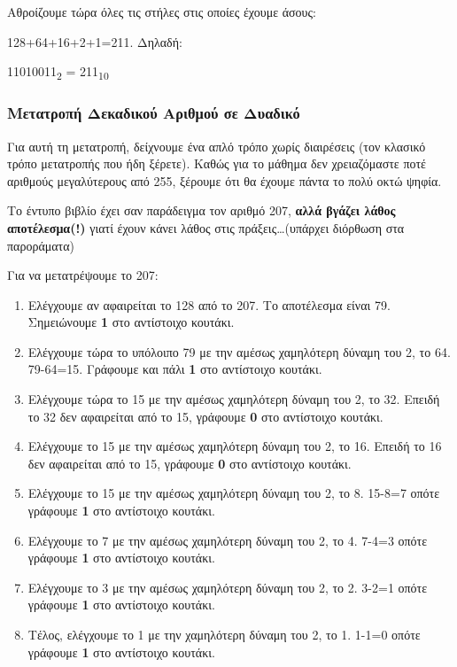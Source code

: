 Αθροίζουμε τώρα όλες τις στήλες στις οποίες έχουμε άσους:

128+64+16+2+1=211. Δηλαδή:

11010011\textsubscript{2} = 211\textsubscript{10}

\subsubsection*{Μετατροπή Δεκαδικού Αριθμού σε Δυαδικό}

Για αυτή τη μετατροπή, δείχνουμε ένα απλό τρόπο χωρίς διαιρέσεις (τον κλασικό τρόπο μετατροπής που ήδη ξέρετε). Καθώς για το μάθημα δεν χρειαζόμαστε ποτέ αριθμούς μεγαλύτερους από 255, ξέρουμε ότι θα έχουμε πάντα το πολύ οκτώ ψηφία.

Το έντυπο βιβλίο έχει σαν παράδειγμα τον αριθμό 207, \textbf{αλλά βγάζει λάθος αποτέλεσμα(!)} γιατί έχουν κάνει λάθος στις πράξεις\ldots (υπάρχει διόρθωση στα παροράματα)

Για να μετατρέψουμε το 207:

\begin{enumerate}
\item Ελέγχουμε αν αφαιρείται το 128 από το 207. Το αποτέλεσμα είναι 79. Σημειώνουμε \textbf{1} στο αντίστοιχο κουτάκι.
\item Ελέγχουμε τώρα το υπόλοιπο 79 με την αμέσως χαμηλότερη δύναμη του 2, το 64. 79-64=15. Γράφουμε και πάλι \textbf{1} στο αντίστοιχο κουτάκι.
\item Ελέγχουμε τώρα το 15 με την αμέσως χαμηλότερη δύναμη του 2, το 32. Επειδή το 32 δεν αφαιρείται από το 15, γράφουμε \textbf{0} στο αντίστοιχο κουτάκι.
\item Ελέγχουμε το 15 με την αμέσως χαμηλότερη δύναμη του 2, το 16. Επειδή το 16 δεν αφαιρείται από το 15, γράφουμε \textbf{0} στο αντίστοιχο κουτάκι.
\item Ελέγχουμε το 15 με την αμέσως χαμηλότερη δύναμη του 2, το 8. 15-8=7 οπότε γράφουμε \textbf{1} στο αντίστοιχο κουτάκι.
\item Ελέγχουμε το 7 με την αμέσως χαμηλότερη δύναμη του 2, το 4. 7-4=3 οπότε γράφουμε \textbf{1} στο αντίστοιχο κουτάκι.
\item Ελέγχουμε το 3 με την αμέσως χαμηλότερη δύναμη του 2, το 2. 3-2=1 οπότε γράφουμε \textbf{1} στο αντίστοιχο κουτάκι.
\item Τέλος, ελέγχουμε το 1 με την χαμηλότερη δύναμη του 2, το 1. 1-1=0 οπότε γράφουμε \textbf{1} στο αντίστοιχο κουτάκι.
\end{enumerate}

